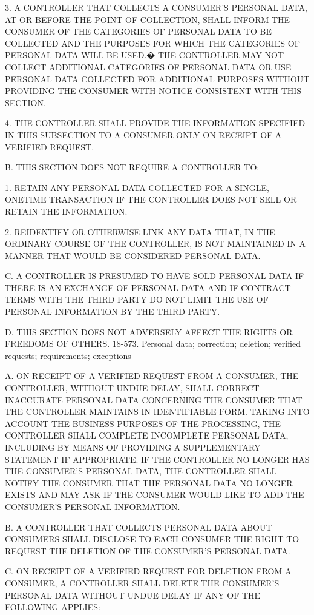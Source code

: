 3. A CONTROLLER THAT COLLECTS A CONSUMER'S PERSONAL DATA, AT OR BEFORE THE POINT OF COLLECTION, SHALL INFORM THE CONSUMER OF THE CATEGORIES OF PERSONAL DATA TO BE COLLECTED AND THE PURPOSES FOR WHICH THE CATEGORIES OF PERSONAL DATA WILL BE USED.� THE CONTROLLER MAY NOT COLLECT ADDITIONAL CATEGORIES OF PERSONAL DATA OR USE PERSONAL DATA COLLECTED FOR ADDITIONAL PURPOSES WITHOUT PROVIDING THE CONSUMER WITH NOTICE CONSISTENT WITH THIS SECTION.

4. THE CONTROLLER SHALL PROVIDE THE INFORMATION SPECIFIED IN THIS SUBSECTION TO A CONSUMER ONLY ON RECEIPT OF A VERIFIED REQUEST.

B. THIS SECTION DOES NOT REQUIRE A CONTROLLER TO:

1. RETAIN ANY PERSONAL DATA COLLECTED FOR A SINGLE, ONETIME TRANSACTION IF THE CONTROLLER DOES NOT SELL OR RETAIN THE INFORMATION.

2. REIDENTIFY OR OTHERWISE LINK ANY DATA THAT, IN THE ORDINARY COURSE OF THE CONTROLLER, IS NOT MAINTAINED IN A MANNER THAT WOULD BE CONSIDERED PERSONAL DATA.

C. A CONTROLLER IS PRESUMED TO HAVE SOLD PERSONAL DATA IF THERE IS AN EXCHANGE OF PERSONAL DATA AND IF CONTRACT TERMS WITH THE THIRD PARTY DO NOT LIMIT THE USE OF PERSONAL INFORMATION BY THE THIRD PARTY.

D. THIS SECTION DOES NOT ADVERSELY AFFECT THE RIGHTS OR FREEDOMS OF OTHERS.
18-573. Personal data; correction; deletion; verified requests; requirements; exceptions

A. ON RECEIPT OF A VERIFIED REQUEST FROM A CONSUMER, THE CONTROLLER, WITHOUT UNDUE DELAY, SHALL CORRECT INACCURATE PERSONAL DATA CONCERNING THE CONSUMER THAT THE CONTROLLER MAINTAINS IN IDENTIFIABLE FORM. TAKING INTO ACCOUNT THE BUSINESS PURPOSES OF THE PROCESSING, THE CONTROLLER SHALL COMPLETE INCOMPLETE PERSONAL DATA, INCLUDING BY MEANS OF PROVIDING A SUPPLEMENTARY STATEMENT IF APPROPRIATE. IF THE CONTROLLER NO LONGER HAS THE CONSUMER'S PERSONAL DATA, THE CONTROLLER SHALL NOTIFY THE CONSUMER THAT THE PERSONAL DATA NO LONGER EXISTS AND MAY ASK IF THE CONSUMER WOULD LIKE TO ADD THE CONSUMER'S PERSONAL INFORMATION.

B. A CONTROLLER THAT COLLECTS PERSONAL DATA ABOUT CONSUMERS SHALL DISCLOSE TO EACH CONSUMER THE RIGHT TO REQUEST THE DELETION OF THE CONSUMER'S PERSONAL DATA.

C. ON RECEIPT OF A VERIFIED REQUEST FOR DELETION FROM A CONSUMER, A CONTROLLER SHALL DELETE THE CONSUMER'S PERSONAL DATA WITHOUT UNDUE DELAY IF ANY OF THE FOLLOWING APPLIES:

